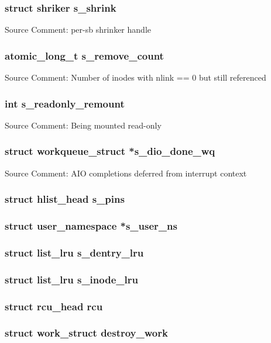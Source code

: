 \documentclass{article}
\newcommand{\sourcecomment}[2][]{Source Comment: #2 \newline #1}
\newcommand{\separator}[0]{\makebox[\textwidth]{\rule{\paperwidth}{0.4pt}}}
\begin{document}
\separator{}

\subsubsection{struct shriker s_shrink}
\sourcecomment{per-sb shrinker handle}

\separator{}

\subsubsection{atomic_long_t s_remove_count}
\sourcecomment{Number of inodes with nlink == 0 but still referenced}

\separator{}

\subsubsection{int s_readonly_remount}
\sourcecomment{Being mounted read-only}

\separator{}

\subsubsection{struct workqueue_struct *s_dio_done_wq}
\sourcecomment{AIO completions deferred from interrupt context}
\subsubsection{struct hlist_head s_pins}

\separator{}

\subsubsection{struct user_namespace *s_user_ns}

\separator{}

\subsubsection{struct list_lru s_dentry_lru}
\subsubsection{struct list_lru s_inode_lru}
\subsubsection{struct rcu_head rcu}
\subsubsection{struct work_struct destroy_work}
\end{document}
